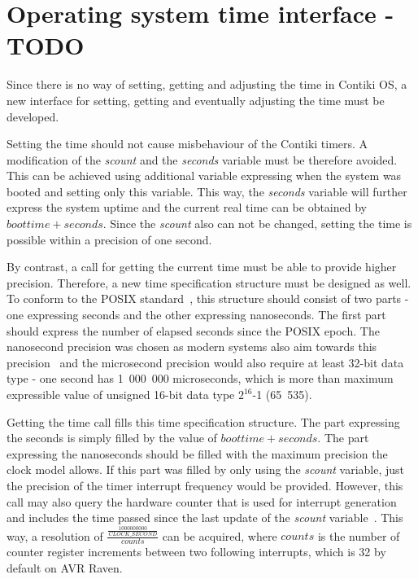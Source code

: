 
\section{Operating system time interface - TODO}
Since there is no way of setting, getting and adjusting the time in Contiki OS,
a new interface for setting, getting and eventually adjusting the time must be developed.

Setting the time should not cause misbehaviour of the Contiki timers.
A modification of the {\it{scount}} and the {\it{seconds}} variable must be therefore avoided.
This can be achieved using additional variable expressing when the system was booted
and setting only this variable.
This way, the {\it{seconds}} variable will further express the system uptime
and the current real time can be obtained by $boottime + seconds$.
Since the {\it{scount}} also can not be changed, setting the time is possible
within a precision of one second.

By contrast, a call for getting the current time must be able to provide higher precision.
Therefore, a new time specification structure must be designed as well.
To conform to the POSIX standard~\cite{posix}, this structure should consist of two parts -
one expressing seconds and the other expressing nanoseconds.
The first part should express the number of elapsed seconds since the POSIX epoch.
The nanosecond precision was chosen as modern systems also aim towards this
precision~\cite{posix,ntp-precision} and
the microsecond precision would also require at least 32-bit data type -
one second has 1~000~000 microseconds, which is more than maximum expressible value of unsigned 16-bit
data type $2^{16}$-1 (65~535).

Getting the time call fills this time specification structure.
The part expressing the seconds is simply filled by the value of $boottime + seconds$.
The part expressing the nanoseconds should be filled with the maximum precision
the clock model allows.
If this part was filled by only using the {\it{scount}} variable,
just the precision of the timer interrupt frequency would be provided.
However, this call may also query the hardware counter that is used for
interrupt generation and includes the time passed since
the last update of the {\it{scount}} variable~\cite{thesis-beat}.
This way, a resolution of $\frac{\frac{1000000000}{CLOCK\_SECOND}}{counts}$ can be acquired,
where $counts$ is the number of counter register increments between two following interrupts,
which is 32 by default on AVR Raven.

